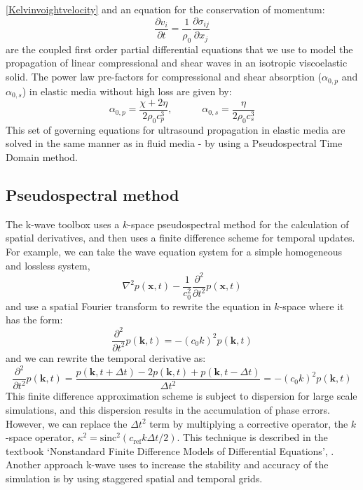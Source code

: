 \documentclass[10pt,a4paper]{article}
\begin{document}
\autoref{Kelvinvoightvelocity} and an equation for the conservation of momentum:
\begin{equation}
\dfrac{\partial v_i}{\partial t} = \dfrac{1}{\rho_0} \dfrac{\partial \sigma_{ij}}{\partial x_j}
\end{equation}
are the coupled first order partial differential equations that we use to model the propagation of linear compressional and shear waves in an isotropic viscoelastic solid. The power law pre-factors for compressional and shear absorption ($\alpha_{0,p}$ and $\alpha_{0,s}$) in elastic media without high loss are given by:
\begin{equation}
\alpha_{0,p} = \dfrac{\chi + 2 \eta}{2 \rho_0 c_p^3}, \quad \quad \quad \alpha_{0,s} = \dfrac{\eta}{2\rho_0 c_s^3}
\end{equation}
This set of governing equations for ultrasound propagation in elastic media are solved in the same manner as in fluid media - by using a Pseudospectral Time Domain method. 

\subsection*{Pseudospectral method}

The k-wave toolbox uses a $k$-space pseudospectral method for the calculation of spatial derivatives, and then uses a finite difference scheme for temporal updates. For example, we can take the wave equation system for a simple homogeneous and lossless system,
\begin{equation}
\nabla^2 p (\textbf{x},t) - \dfrac{1}{c_0^2} \dfrac{\partial^2}{\partial t^2} p (\textbf{x},t)
\end{equation}
and use a spatial Fourier transform to rewrite the equation in $k$-space where it has the form:
\begin{equation}
\frac{\partial^2}{\partial t^2} p(\textbf{k},t) = - (c_0 k)^2 p(\textbf{k},t)
\end{equation}
and we can rewrite the temporal derivative as:
\begin{equation}
\frac{\partial^2}{\partial t^2} p(\textbf{k},t) = \dfrac{p(\textbf{k},t+\Delta t) - 2p(\textbf{k},t)+p(\textbf{k}, t-\Delta t)}{\Delta t^2} = - (c_0 k)^2 p(\textbf{k},t)
\end{equation}
This finite difference approximation scheme is subject to dispersion for large scale simulations, and this dispersion results in the accumulation of phase errors. However, we can replace the $\Delta t^2$ term by multiplying a corrective operator, the $k$-space operator, $\kappa^2 = \text{sinc}^2(c_{\text{ref}} k \Delta t/2)$. This technique is described in the textbook `Nonstandard Finite Difference Models of Differential Equations', \cite{mickens1993nonstandard}. Another approach k-wave uses to increase the stability and accuracy of the simulation is by using staggered spatial and temporal grids. 
\end{document}

